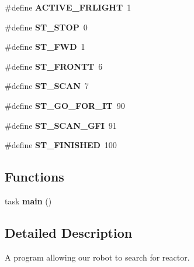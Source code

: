 \begin{DoxyCompactItemize}
\item 
\hypertarget{reactor_8nxc_a4b9906c8adddf636daee1677e3172b90}{
\#define {\bfseries ACTIVE\_\-FRLIGHT}~1}
\label{reactor_8nxc_a4b9906c8adddf636daee1677e3172b90}

\item 
\hypertarget{reactor_8nxc_a8ccbe4f289c6182e18589c6f2c6108ee}{
\#define {\bfseries ST\_\-STOP}~0}
\label{reactor_8nxc_a8ccbe4f289c6182e18589c6f2c6108ee}

\item 
\hypertarget{reactor_8nxc_abba849981e74e84eb3836d3c03c363a9}{
\#define {\bfseries ST\_\-FWD}~1}
\label{reactor_8nxc_abba849981e74e84eb3836d3c03c363a9}

\item 
\hypertarget{reactor_8nxc_a82671cbfd87d61e73ed46e39a25ea515}{
\#define {\bfseries ST\_\-FRONTT}~6}
\label{reactor_8nxc_a82671cbfd87d61e73ed46e39a25ea515}

\item 
\hypertarget{reactor_8nxc_a3744009c444a7b62295fa027e1f42a15}{
\#define {\bfseries ST\_\-SCAN}~7}
\label{reactor_8nxc_a3744009c444a7b62295fa027e1f42a15}

\item 
\hypertarget{reactor_8nxc_af8e9dc0efb6c5ba062bc1fdace7300be}{
\#define {\bfseries ST\_\-GO\_\-FOR\_\-IT}~90}
\label{reactor_8nxc_af8e9dc0efb6c5ba062bc1fdace7300be}

\item 
\hypertarget{reactor_8nxc_a01eb7829648bea6bf8eaa82af9dacddb}{
\#define {\bfseries ST\_\-SCAN\_\-GFI}~91}
\label{reactor_8nxc_a01eb7829648bea6bf8eaa82af9dacddb}

\item 
\hypertarget{reactor_8nxc_a1c7e6cd43336e10d60f8c0635e8b7734}{
\#define {\bfseries ST\_\-FINISHED}~100}
\label{reactor_8nxc_a1c7e6cd43336e10d60f8c0635e8b7734}

\end{DoxyCompactItemize}
\subsection*{Functions}
\begin{DoxyCompactItemize}
\item 
\hypertarget{reactor_8nxc_a9a2af8e2cd81255d3bf384db4a382807}{
task {\bfseries main} ()}
\label{reactor_8nxc_a9a2af8e2cd81255d3bf384db4a382807}

\end{DoxyCompactItemize}


\subsection{Detailed Description}
A program allowing our robot to search for reactor. 